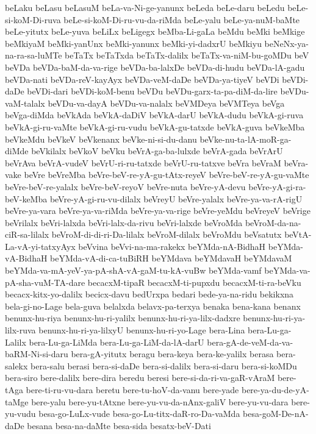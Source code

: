 {beLaku
beLasu
beLasuM
beLa-va-Ni-ge-yanunx
beLeda
beLe-daru
beLedu
beLe-si-koM-Di-ruva
beLe-si-koM-Di-ru-vu-da-riMda
beLe-yalu
beLe-ya-nuM-baMte
beLe-yitutx
beLe-yuva
beLiLx
beLigegx
beMba-Li-gaLa
beMdu
beMki
beMkige
beMkiyaM
beMki-yanUnx
beMki-yanunx
beMki-yi-dadxrU
beMkiyu
beNeNx-ya-na-ra-sa-luMTe
beTaTx
beTaTxda
beTaTx-dalilx
beTaTx-va-niM-bu-goMDu
beV
beVDa
beVDa-baM-da-va-rige
beVDa-ba-lalxDe
beVDa-di-hudu
beVDa-lA-gadu
beVDa-nati
beVDa-reV-kayAyx
beVDa-veM-daDe
beVDa-ya-tiyeV
beVDi
beVDi-daDe
beVDi-dari
beVDi-koM-benu
beVDu
beVDu-garx-ta-pa-diM-da-lire
beVDu-vaM-talalx
beVDu-va-dayA
beVDu-va-nalalx
beVMDeya
beVMTeya
beVga
beVga-diMda
beVkAda
beVkA-daDiV
beVkA-darU
beVkA-dudu
beVkA-gi-ruva
beVkA-gi-ru-vaMte
beVkA-gi-ru-vudu
beVkA-gu-tatxde
beVkA-guva
beVkeMba
beVkeMdu
beVkeV
beVkenanx
beVke-ni-si-du-danu
beVke-nu-ta-lA-moR-ga-diMde
beVkilalx
beVkoV
beVku
beVrA-ga-ba-lulxde
beVrA-gada
beVrArU
beVrAva
beVrA-vudeV
beVrU-ri-ru-tatxde
beVrU-ru-tatxve
beVra
beVraM
beVra-vake
beVre
beVreMba
beVre-beV-re-yA-gu-tAtx-reyeV
beVre-beV-re-yA-gu-vaMte
beVre-beV-re-yalalx
beVre-beV-reyoV
beVre-nuta
beVre-yA-devu
beVre-yA-gi-ra-beV-keMba
beVre-yA-gi-ru-vu-dilalx
beVreyU
beVre-yalalx
beVre-ya-va-rA-rigU
beVre-ya-vara
beVre-ya-va-riMda
beVre-ya-va-rige
beVre-yeMdu
beVreyeV
beVrige
beVrilalx
beVri-lalxda
beVri-lalx-da-rivu
beVri-lalxde
beVroMda
beVroM-da-na-ciR-sa-lilalx
beVroM-di-di-ri-Da-lilalx
beVroM-dilalx
beVroMdu
beVsatutx
beVtA-La-vA-yi-tatxyAyx
beVvina
beVvi-na-ma-rakekx
beYMda-nA-BidhaH
beYMda-vA-BidhaH
beYMda-vA-di-ca-tuBiRH
beYMdava
beYMdavaH
beYMdavaM
beYMda-va-mA-yeV-ya-pA-shA-vA-gaM-tu-kA-vuBw
beYMda-vamf
beYMda-va-pA-sha-vuM-TA-dare
becacxM-tipaR
becacxM-ti-pupxdu
becacxM-ti-ra-beVku
becacx-kitx-yo-dalilx
becicx-davu
bedUrxpa
bedari
bede-ya-na-ridu
bekikxna
bela-gi-no-Lage
bela-guva
belalxda
belavx-pa-terxya
benaka
bena-kana
benanx
benunx-hu-riya
benunx-hu-ri-yalilx
benunx-hu-ri-ya-lilx-dadxre
benunx-hu-ri-ya-lilx-ruva
benunx-hu-ri-ya-lilxyU
benunx-hu-ri-yo-Lage
bera-Lina
bera-Lu-ga-Lalilx
bera-Lu-ga-LiMda
bera-Lu-ga-LiM-da-lA-darU
bera-gA-de-veM-da-va-baRM-Ni-si-daru
bera-gA-yitutx
beragu
bera-keya
bera-ke-yalilx
berasa
bera-salekx
bera-salu
berasi
bera-si-daDe
bera-si-dalilx
bera-si-daru
bera-si-koMDu
bera-siro
bere-dalilx
bere-dira
beredu
beresi
bere-si-da-ri-va-gaR-vAraM
bere-tAga
bere-ti-ru-vu-dara
beretu
bere-tu-hoV-da-vanu
bere-yade
bere-ya-du-de-yA-taMge
bere-yalu
bere-yu-tAtxne
bere-yu-vu-da-nAnx-galiV
bere-yu-vu-dara
bere-yu-vudu
besa-go-LuLx-vude
besa-go-Lu-titx-daR-ro-Da-vaMda
besa-goM-De-nA-daDe
besana
besa-na-daMte
besa-sida
besatx-beV-Dati
}
